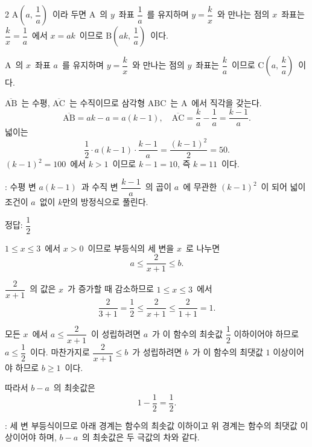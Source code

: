 \documentclass[10pt,fleqn]{article}
\begin{document}
\begin{multicols*}{2}
$\mathrm{A}\!\left(a,\, \dfrac{1}{a}\right)$\ 이라 두면 $\mathrm{A}$\ 의 $y$\ 좌표 $\dfrac{1}{a}$\ 를 유지하며 $y=\dfrac{k}{x}$\ 와 만나는 점의 $x$\ 좌표는 $\dfrac{k}{x}=\dfrac{1}{a}$\ 에서 $x=ak$\ 이므로 $\mathrm{B}\!\left(ak,\, \dfrac{1}{a}\right)$\ 이다.

$\mathrm{A}$\ 의 $x$\ 좌표 $a$\ 를 유지하며 $y=\dfrac{k}{x}$\ 와 만나는 점의 $y$\ 좌표는 $\dfrac{k}{a}$\ 이므로 $\mathrm{C}\!\left(a,\, \dfrac{k}{a}\right)$\ 이다.

$\overline{\mathrm{AB}}$\ 는 수평, $\overline{\mathrm{AC}}$\ 는 수직이므로 삼각형 $\mathrm{ABC}$\ 는 $\mathrm{A}$\ 에서 직각을 갖는다.
\[ \overline{\mathrm{AB}}=ak-a=a(k-1),\quad \overline{\mathrm{AC}}=\dfrac{k}{a}-\dfrac{1}{a}=\dfrac{k-1}{a}. \]
넓이는
\[ \dfrac{1}{2}\cdot a(k-1)\cdot\dfrac{k-1}{a}=\dfrac{(k-1)^{2}}{2}=50. \]
$(k-1)^{2}=100$\ 에서 $k>1$\ 이므로 $k-1=10$, 즉 $k=11$\ 이다.

\begin{dmcriticalpoint}
: 수평 변 $a(k-1)$\ 과 수직 변 $\dfrac{k-1}{a}$\ 의 곱이 $a$\ 에 무관한 $(k-1)^{2}$\ 이 되어 넓이 조건이 $a$\ 없이 $k$만의 방정식으로 풀린다.
\end{dmcriticalpoint}

\begin{dmanswerbox}
정답: $\dfrac{1}{2}$
\end{dmanswerbox}

$1\le x\le 3$\ 에서 $x>0$\ 이므로 부등식의 세 변을 $x$\ 로 나누면
\[ a\le \dfrac{2}{x+1}\le b. \]

$\dfrac{2}{x+1}$\ 의 값은 $x$\ 가 증가할 때 감소하므로 $1\le x\le 3$\ 에서
\[ \dfrac{2}{3+1}=\dfrac{1}{2}\le \dfrac{2}{x+1}\le \dfrac{2}{1+1}=1. \]

모든 $x$\ 에서 $a\le \dfrac{2}{x+1}$\ 이 성립하려면 $a$\ 가 이 함수의 최솟값 $\dfrac{1}{2}$ 이하이어야 하므로 $a\le \dfrac{1}{2}$\ 이다. 마찬가지로 $\dfrac{2}{x+1}\le b$\ 가 성립하려면 $b$\ 가 이 함수의 최댓값 $1$ 이상이어야 하므로 $b\ge 1$\ 이다.

따라서 $b-a$\ 의 최솟값은
\[ 1-\dfrac{1}{2}=\dfrac{1}{2}. \]

\begin{dmcriticalpoint}
: 세 변 부등식이므로 아래 경계는 함수의 최솟값 이하이고 위 경계는 함수의 최댓값 이상이어야 하며, $b-a$\ 의 최솟값은 두 극값의 차와 같다.
\end{dmcriticalpoint}


\end{multicols*}
\end{document}
